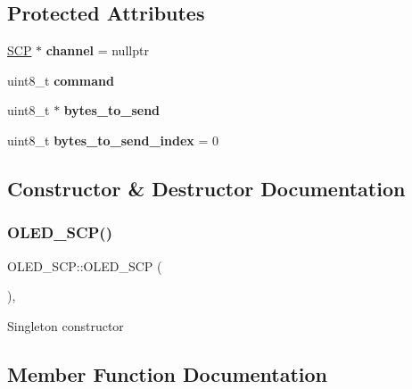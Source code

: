 \subsection*{Protected Attributes}
\begin{DoxyCompactItemize}
\item 
\hypertarget{class_o_l_e_d___s_c_p_aeffe5e3de0c2fd0345c5059334b93b64}{}\label{class_o_l_e_d___s_c_p_aeffe5e3de0c2fd0345c5059334b93b64} 
\hyperlink{class_s_c_p}{S\+CP} $\ast$ {\bfseries channel} = nullptr
\item 
\hypertarget{class_o_l_e_d___s_c_p_ac3bd64cdb125ee088a59834635c038a3}{}\label{class_o_l_e_d___s_c_p_ac3bd64cdb125ee088a59834635c038a3} 
uint8\+\_\+t {\bfseries command}
\item 
\hypertarget{class_o_l_e_d___s_c_p_afa645cae97534763fa5e44f79cb7e03f}{}\label{class_o_l_e_d___s_c_p_afa645cae97534763fa5e44f79cb7e03f} 
uint8\+\_\+t $\ast$ {\bfseries bytes\+\_\+to\+\_\+send}
\item 
\hypertarget{class_o_l_e_d___s_c_p_adf0fee62e45244241a53c5b5232f4e5e}{}\label{class_o_l_e_d___s_c_p_adf0fee62e45244241a53c5b5232f4e5e} 
uint8\+\_\+t {\bfseries bytes\+\_\+to\+\_\+send\+\_\+index} = 0
\end{DoxyCompactItemize}


\subsection{Constructor \& Destructor Documentation}
\hypertarget{class_o_l_e_d___s_c_p_a8a52dd583b6f4bdf479204c31c99b4b7}{}\label{class_o_l_e_d___s_c_p_a8a52dd583b6f4bdf479204c31c99b4b7} 
\subsubsection{\texorpdfstring{O\+L\+E\+D\+\_\+\+S\+C\+P()}{OLED\_SCP()}}
{\footnotesize\ttfamily O\+L\+E\+D\+\_\+\+S\+C\+P\+::\+O\+L\+E\+D\+\_\+\+S\+CP (\begin{DoxyParamCaption}{ }\end{DoxyParamCaption})\hspace{0.3cm}{\ttfamily [inline]}, {\ttfamily [protected]}}

Singleton constructor 

\subsection{Member Function Documentation}
\hypertarget{class_o_l_e_d___s_c_p_a25644abcadcbb50816128fb31b7af83b}{}\label{class_o_l_e_d___s_c_p_a25644abcadcbb50816128fb31b7af83b} 
